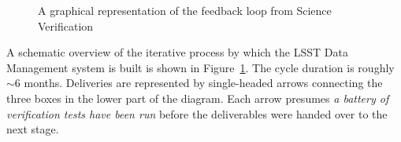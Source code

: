 \begin{figure}
\centering
{}
\caption{A graphical representation of the feedback loop from Science
Verification\label{fig:iterativeDevelopment}}
\end{figure}


A schematic overview of the iterative process by which the LSST Data
Management system is built is shown in
Figure~\ref{fig:iterativeDevelopment}.  The cycle duration is roughly $\sim
6$ months.  Deliveries are represented by single-headed arrows connecting
the three boxes in the lower part of the diagram.  Each arrow presumes {\em
a battery of verification tests have been run} before the deliverables
were handed over to the next stage.

